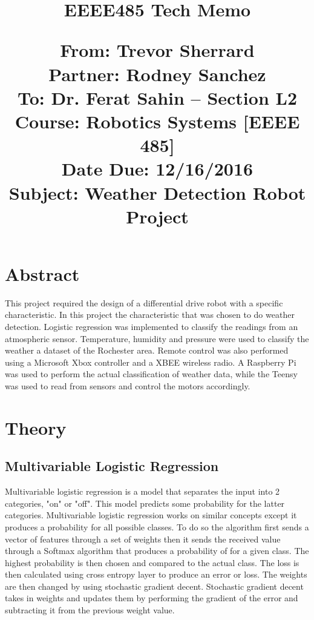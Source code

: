 \documentclass[UTF8]{article}
\begin{document}
\title{%
 \Huge \textbf{EEEE485 Tech Memo}  \\
  \begin{flushleft}
   \Large \textbf{From:} Trevor Sherrard \\
         \textbf{Partner:} Rodney Sanchez  \\
         \textbf{To:}  Dr. Ferat Sahin -- Section L2 \\
         \textbf{Course:} Robotics Systems [EEEE 485] \\
         \textbf{Date Due:} 12/16/2016 \\
		 \textbf{Subject:} Weather Detection Robot Project
		 \end{flushleft}}
\maketitle
\newpage
\large
\section{Abstract}
This project required the design of a differential drive robot with a specific characteristic. In this project the characteristic that was chosen to do weather detection. Logistic regression was implemented to classify the readings from an atmospheric sensor. Temperature, humidity and pressure were used to classify the weather a dataset of the Rochester area. Remote control was also performed using a Microsoft Xbox controller and a XBEE wireless radio. A Raspberry Pi was used to perform the actual classification of weather data, while the Teensy was used to read from sensors and control the motors accordingly.

\section{Theory}

\subsection{Multivariable Logistic Regression}
Multivariable logistic regression is a model that separates the input into 2 categories, "on" or "off". This model predicts some probability for the latter categories. Multivariable logistic regression works on similar concepts except it produces a probability for all possible classes. To do so the algorithm first sends a vector of features through a set of weights then it sends the received value through a Softmax algorithm that produces a probability of for a given class. The highest probability is then chosen and compared to the actual class. The loss is then calculated using cross entropy layer to produce an error or loss. The weights are then changed by using stochastic gradient decent. Stochastic gradient decent takes in weights and updates them by performing the gradient of the error and subtracting it from the previous weight value.
\end{document}
